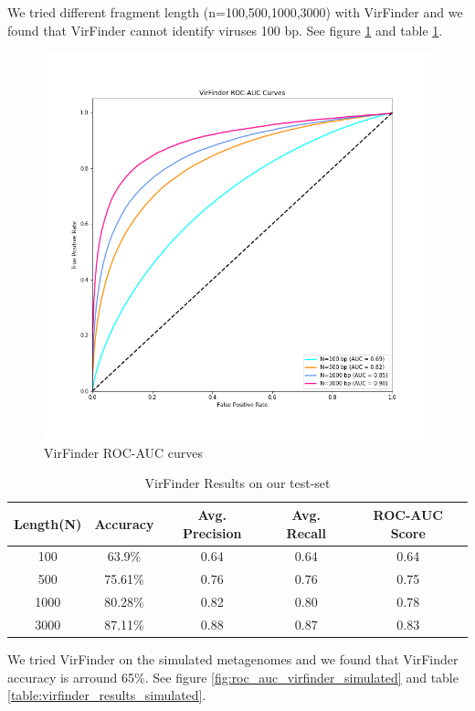 \documentclass[conference]{IEEEtran}
\begin{document}
We tried different fragment length (n=100,500,1000,3000) with VirFinder and we found that VirFinder cannot identify viruses 100 bp. See figure \ref{fig:roc_auc_virfinder} and table \ref{table:virfinder_results}.

\begin{figure}
	\centering
	\includegraphics[width=\columnwidth]{imgs/roc_auc.png}
	\caption{VirFinder ROC-AUC curves}
	\label{fig:roc_auc_virfinder}
\end{figure}


\begin{table}[h!]
	\centering
	\begin{tabular}{||c c c c c||} 
		Length(N) &	Accuracy & Avg. Precision & Avg. Recall &	ROC-AUC Score \\ [0.5ex] 
		\hline\hline
		100 &	63.9\%	& 0.64 & 0.64 & 0.64 \\
		500 &	75.61\% &	0.76 & 0.76 & 0.75 \\
		1000 &	80.28\% & 0.82 & 0.80 & 0.78 \\
		3000 &	87.11\% & 0.88 & 0.87 & 0.83\\[1ex]
	\end{tabular}
	\caption{VirFinder Results on our test-set}
	\label{table:virfinder_results}
\end{table}


We tried VirFinder on the simulated metagenomes and we found that VirFinder accuracy is arround 65\%. See figure \ref{fig:roc_auc_virfinder_simulated} and table \ref{table:virfinder_results_simulated}.
\end{document}
